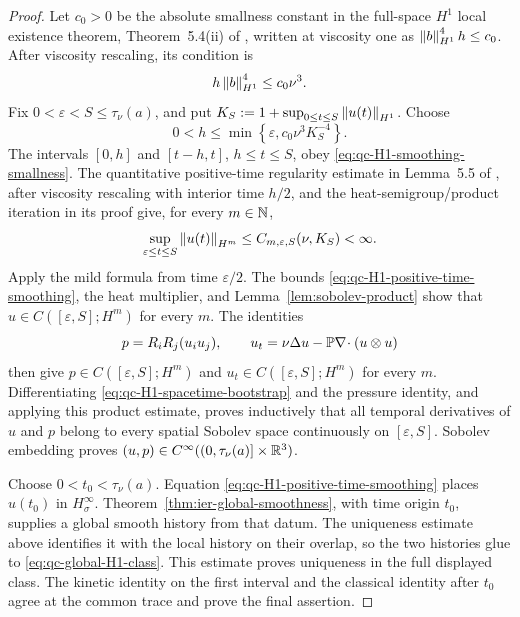 \begin{proof}
Let \(c_0>0\) be the absolute smallness constant in the full-space
\(H^1\) local existence theorem, Theorem~5.4(ii) of \cite{Tao2013},
written at viscosity one as
\(\left\lVert b\right\rVert_{H^1}^4h\le c_0\).  After viscosity rescaling, its condition is
\begin{equation}
 h\left\lVert b\right\rVert_{H^1}^4\le c_0\nu^3.
 \label{eq:qc-H1-smoothing-smallness}
\end{equation}
Fix \(0<\varepsilon<S\le\tau_\nu(a)\), and put
\(K_S:=1+\sup_{0\le t\le S}\left\lVert u(t)\right\rVert_{H^1}\).  Choose
\[
 0<h\le\min\left\{\varepsilon,
 c_0\nu^3K_S^{-4}\right\}.
\]
The intervals \([0,h]\) and \([t-h,t]\), \(h\le t\le S\), obey
\eqref{eq:qc-H1-smoothing-smallness}.  The quantitative positive-time
regularity estimate in Lemma~5.5 of \cite{Tao2013}, after viscosity
rescaling with interior time \(h/2\), and the
heat-semigroup/product iteration in its proof give, for every \(m\in\mathbb N\),
\begin{equation}
 \sup_{\varepsilon\le t\le S}\left\lVert u(t)\right\rVert_{H^m}
 \le C_{m,\varepsilon,S}(\nu,K_S)<\infty.
 \label{eq:qc-H1-positive-time-smoothing}
\end{equation}
Apply the mild formula from time \(\varepsilon/2\).  The bounds
\eqref{eq:qc-H1-positive-time-smoothing}, the heat multiplier, and
Lemma~\ref{lem:sobolev-product} show that
\(u\in C([\varepsilon,S];H^m)\) for every \(m\).  The identities
\begin{equation}
 p=R_iR_j(u_i u_j),
 \qquad
 u_t=\nu\Delta u-\mathbb P\nabla\!\cdot(u\otimes u)
 \label{eq:qc-H1-spacetime-bootstrap}
\end{equation}
then give
\(p\in C([\varepsilon,S];H^m)\) and
\(u_t\in C([\varepsilon,S];H^m)\) for every \(m\).  Differentiating
\eqref{eq:qc-H1-spacetime-bootstrap} and the pressure identity, and applying
this product estimate, proves inductively that all temporal derivatives
of \(u\) and \(p\) belong to every spatial Sobolev space continuously on
\([\varepsilon,S]\).  Sobolev embedding proves
\((u,p)\in C^\infty((0,\tau_\nu(a)]\times\mathbb R^3)\).

Choose \(0<t_0<\tau_\nu(a)\).  Equation
\eqref{eq:qc-H1-positive-time-smoothing} places \(u(t_0)\) in
\(H^\infty_\sigma\).  Theorem~\ref{thm:ier-global-smoothness}, with time
origin \(t_0\), supplies a global smooth history from that datum.  The
uniqueness estimate above identifies it with the local history on their
overlap, so the two histories glue to \eqref{eq:qc-global-H1-class}.
This estimate proves uniqueness in the full displayed class.  The kinetic
identity on the first interval and the classical identity after \(t_0\) agree
at the common trace and prove the final assertion.
\end{proof}

